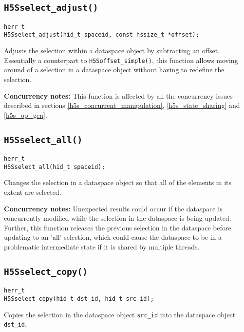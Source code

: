 \documentclass[../HDF5_RFC.tex]{subfiles}
\begin{document}
\subsection{\texttt{H5Sselect\_adjust()}}
\label{apdx:h5s_func_h5sselect_adjust}

\begin{verbatim}
herr_t
H5Sselect_adjust(hid_t spaceid, const hssize_t *offset);
\end{verbatim}

Adjusts the selection within a dataspace object by subtracting an offset. Essentially a counterpart
to \texttt{H5Soffset\_simple()}, this function allows moving around of a selection in a dataspace
object without having to redefine the selection.

\textbf{Concurrency notes:} This function is affected by all the concurrency issues described in
sections \ref{h5s_concurrent_manipulation}, \ref{h5s_state_sharing} and \ref{h5s_op_gen}.

\subsection{\texttt{H5Sselect\_all()}}
\label{apdx:h5s_func_h5sselect_all}

\begin{verbatim}
herr_t
H5Sselect_all(hid_t spaceid);
\end{verbatim}

Changes the selection in a dataspace object so that all of the elements in its extent are selected.

\textbf{Concurrency notes:} Unexpected results could occur if the dataspace is concurrently
modified while the selection in the dataspace is being updated. Further, this function releases
the previous selection in the dataspace before updating to an 'all' selection, which could cause
the dataspace to be in a problematic intermediate state if it is shared by multiple threads.

\subsection{\texttt{H5Sselect\_copy()}}
\label{apdx:h5s_func_h5sselect_copy}

\begin{verbatim}
herr_t
H5Sselect_copy(hid_t dst_id, hid_t src_id);
\end{verbatim}

Copies the selection in the dataspace object \texttt{src\_id} into the dataspace object \texttt{dst\_id}.
\end{document}
